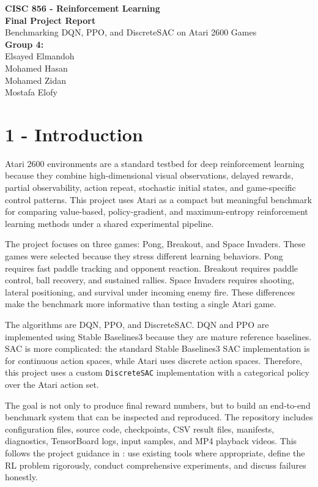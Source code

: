 \documentclass[11pt]{article}
\begin{document}
\begin{titlepage}
\centering
\vspace*{1.5cm}
{\Large \textbf{CISC 856 - Reinforcement Learning}}\\[2.5cm]
{\Large \textbf{Final Project Report}}\\[2.5cm]
{\LARGE Benchmarking DQN, PPO, and DiscreteSAC on Atari 2600 Games}\\[2.5cm]
{\large \textbf{Group 4:}}\\[0.8cm]
{\large Elsayed Elmandoh}\\[0.25cm]
{\large Mohamed Hasan}\\[0.25cm]
{\large Mohamed Zidan}\\[0.25cm]
{\large Mostafa Elofy}
\vfill
\end{titlepage}

\section*{1 - Introduction}

Atari 2600 environments are a standard testbed for deep reinforcement learning because they combine high-dimensional visual observations, delayed rewards, partial observability, action repeat, stochastic initial states, and game-specific control patterns. This project uses Atari as a compact but meaningful benchmark for comparing value-based, policy-gradient, and maximum-entropy reinforcement learning methods under a shared experimental pipeline.

The project focuses on three games: Pong, Breakout, and Space Invaders. These games were selected because they stress different learning behaviors. Pong requires fast paddle tracking and opponent reaction. Breakout requires paddle control, ball recovery, and sustained rallies. Space Invaders requires shooting, lateral positioning, and survival under incoming enemy fire. These differences make the benchmark more informative than testing a single Atari game.

The algorithms are DQN, PPO, and DiscreteSAC. DQN and PPO are implemented using Stable Baselines3 because they are mature reference baselines. SAC is more complicated: the standard Stable Baselines3 SAC implementation is for continuous action spaces, while Atari uses discrete action spaces. Therefore, this project uses a custom \texttt{DiscreteSAC} implementation with a categorical policy over the Atari action set.

The goal is not only to produce final reward numbers, but to build an end-to-end benchmark system that can be inspected and reproduced. The repository includes configuration files, source code, checkpoints, CSV result files, manifests, diagnostics, TensorBoard logs, input samples, and MP4 playback videos. This follows the project guidance in : use existing tools where appropriate, define the RL problem rigorously, conduct comprehensive experiments, and discuss failures honestly.
\end{document}

